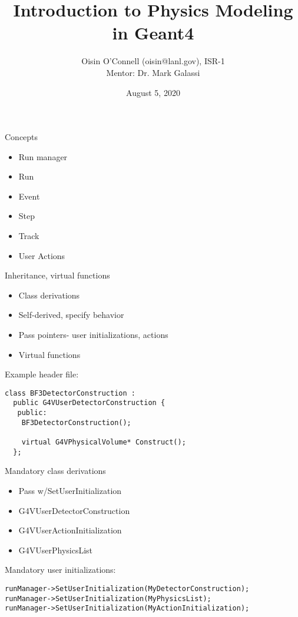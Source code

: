 \documentclass[aspectratio=169]{beamer}
\title[Title]{Introduction to Physics Modeling in Geant4}
\author{Oisin O'Connell (oisin@lanl.gov), ISR-1\\ Mentor: Dr. Mark Galassi}
\institute{Los Alamos National Lab (LA-UR-20-25374)}
\date{August 5, 2020}
\begin{document}
\begin{frame}
  \maketitle
\end{frame}

\begin{frame}{Concepts}
  \begin{block}{}
    \begin{itemize}
    \item Run manager
    \item Run
    \item Event
    \item Step
    \item Track
    \item User Actions
    \end{itemize}
  \end{block}
\end{frame}

\begin{frame}[fragile]{Inheritance, virtual functions}
  \begin{itemize}
  \item Class derivations
  \item Self-derived, specify behavior
  \item Pass pointers- user initializations, actions
  \item Virtual functions
  \end{itemize}
  
  \begin{block}{Example header file:}
    \begin{Verbatim}[fontsize=\small]
class BF3DetectorConstruction :
  public G4VUserDetectorConstruction {
   public:
    BF3DetectorConstruction();

    virtual G4VPhysicalVolume* Construct();
  };
    \end{Verbatim}
  \end{block}
\end{frame}

\begin{frame}[fragile]{Mandatory class derivations}
  \begin{itemize}
  \item Pass w/SetUserInitialization
  \item G4VUserDetectorConstruction
  \item G4VUserActionInitialization
  \item G4VUserPhysicsList
  \end{itemize}
  
  \begin{block}{Mandatory user initializations:}
    \begin{Verbatim}[fontsize=\small]
runManager->SetUserInitialization(MyDetectorConstruction);
runManager->SetUserInitialization(MyPhysicsList);
runManager->SetUserInitialization(MyActionInitialization);
    \end{Verbatim}
  \end{block}
\end{frame}
\end{document}
